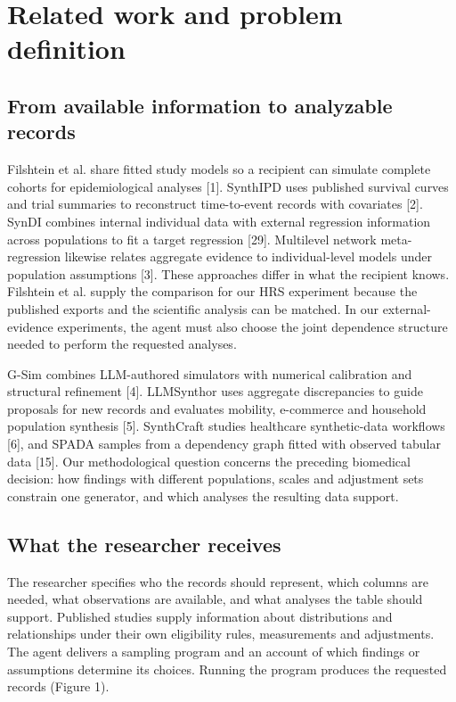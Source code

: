 \documentclass[sigconf,review]{acmart}
\begin{document}
\section{Related work and problem definition}

\subsection{From available information to analyzable records}

Filshtein et al. share fitted study models so a recipient can simulate complete cohorts for epidemiological analyses [1]. SynthIPD uses published survival curves and trial summaries to reconstruct time-to-event records with covariates [2]. SynDI combines internal individual data with external regression information across populations to fit a target regression [29]. Multilevel network meta-regression likewise relates aggregate evidence to individual-level models under population assumptions [3]. These approaches differ in what the recipient knows. Filshtein et al. supply the comparison for our HRS experiment because the published exports and the scientific analysis can be matched. In our external-evidence experiments, the agent must also choose the joint dependence structure needed to perform the requested analyses.


G-Sim combines LLM-authored simulators with numerical calibration and structural refinement [4]. LLMSynthor uses aggregate discrepancies to guide proposals for new records and evaluates mobility, e-commerce and household population synthesis [5]. SynthCraft studies healthcare synthetic-data workflows [6], and SPADA samples from a dependency graph fitted with observed tabular data [15]. Our methodological question concerns the preceding biomedical decision: how findings with different populations, scales and adjustment sets constrain one generator, and which analyses the resulting data support.


\subsection{What the researcher receives}

The researcher specifies who the records should represent, which columns are needed, what observations are available, and what analyses the table should support. Published studies supply information about distributions and relationships under their own eligibility rules, measurements and adjustments. The agent delivers a sampling program and an account of which findings or assumptions determine its choices. Running the program produces the requested records (Figure 1).
\end{document}
